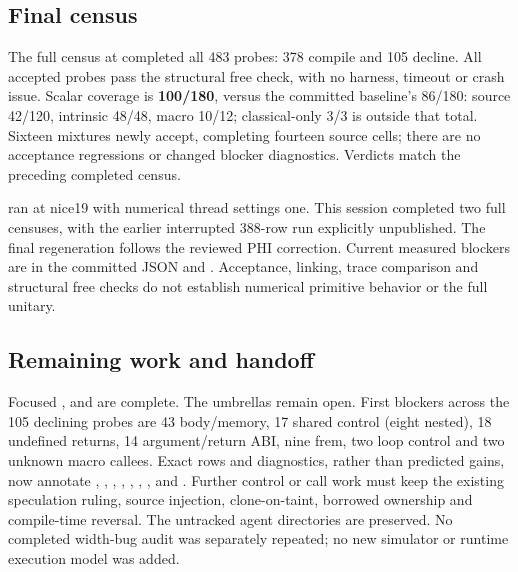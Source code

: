 \subsection*{Final census}
The full census at  completed all 483 probes:
378 compile and 105 decline. All accepted probes pass the structural free
check, with no harness, timeout or crash issue. Scalar coverage is
\textbf{100/180}, versus the committed baseline's 86/180:
source 42/120, intrinsic 48/48, macro 10/12; classical-only 3/3 is outside
that total. Sixteen mixtures newly accept, completing fourteen source cells;
there are no acceptance regressions or changed blocker diagnostics. Verdicts
match the preceding completed  census.

ran at nice19 with numerical thread settings one. This session completed two
full censuses, with the earlier interrupted 388-row run explicitly unpublished.
The final regeneration follows the reviewed PHI correction. Current measured
blockers are in the committed JSON and
.
Acceptance, linking, trace comparison and structural free checks do not establish
numerical primitive behavior or the full unitary.

\subsection*{Remaining work and handoff}
Focused ,  and  are complete.
The umbrellas remain open. First blockers across the 105 declining probes are
43 body/memory, 17 shared control (eight nested), 18 undefined returns,
14 argument/return ABI, nine frem, two loop control and two unknown macro
callees. Exact rows and diagnostics, rather than predicted gains, now annotate
, , , ,
, , ,  and .
Further control or call work must keep the existing speculation ruling,
source injection, clone-on-taint, borrowed ownership and compile-time reversal.
The untracked agent directories are preserved. No completed width-bug audit
was separately repeated; no new simulator or runtime execution model was added.
